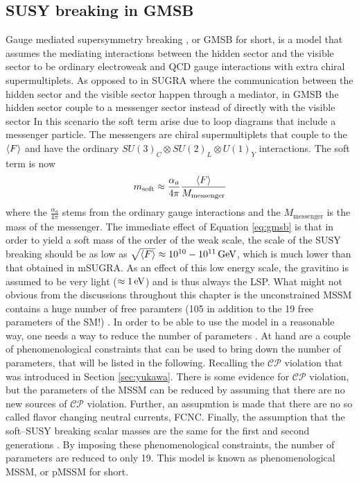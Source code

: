 \subsection*{SUSY breaking in GMSB}
\noindent\justify
Gauge mediated supersymmetry breaking \cite{Dine:1981gu,Nappi:1982hm,Dine:248065}, or GMSB for short, is a model that assumes the mediating interactions between the hidden sector and the visible sector to be ordinary electroweak and QCD gauge interactions with extra chiral supermultiplets. 
As opposed to in SUGRA where the communication between the hidden sector and the visible sector happen through a mediator, in GMSB the hidden sector couple to a messenger sector instead of directly with the visible sector
In this scenario the soft term arise due to loop diagrams that include a messenger particle. 
The messengers are chiral supermultiplets that couple to the $\braket{F}$ and have the ordinary $SU(3)_{C}\otimes SU(2)_{L}\otimes U(1)_{Y}$ interactions. 
The soft term is now
\begin{equation}
m_{\mathrm{soft}}\approx\frac{\alpha_{a}}{4\pi}\frac{\braket{F}}{M_{\mathrm{messenger}}}
\label{eq:gmsb}
\end{equation}
where the $\frac{\alpha_{a}}{4\pi}$ stems from the ordinary gauge interactions and the $M_{\mathrm{messenger}}$ is the mass of the messenger. 
The immediate effect of Equation \ref{eq:gmsb} is that in order to yield a soft mass of the order of the weak scale, the scale of the SUSY breaking should be as low as $\sqrt{\braket{F}}\approx10^{10}-10^{11}\,\text{Ge\hspace{-.08em}V}$, which is much lower than that obtained in mSUGRA.
As an effect of this low energy scale, the gravitino is assumed to be very light ($\approx1\,\text{e\hspace{-.08em}V}$) and is thus always the LSP. 
\newpara
\noindent\justify
What might not obvious from the discussions throughout this chapter is the unconstrained MSSM contains a huge number of free paramters (105 in addition to the 19 free parameters of the SM!) \cite{Dimopoulos:1995ju}.
In order to be able to use the model in a reasonable way, one needs a way to reduce the number of parameters \cite{Djouadi:1998di}. 
At hand are a couple of phenomenological constraints that can be used to bring down the number of parameters, that will be listed in the following. 
Recalling the $\mathcal{CP}$ violation that was introduced in Section \ref{sec:yukawa}. 
There is some evidence for $\mathcal{CP}$ violation, but the parameters of the MSSM can be reduced by assuming that there are no new sources of $\mathcal{CP}$ violation.  
Further, an assupmtion is made that there are no so called flavor changing neutral currents, FCNC. 
Finally, the assumption that the soft–SUSY breaking scalar masses are the same for the first and second generations \cite{Djouadi:1998di}.
By imposing these phenomenological constraints, the number of parameters are reduced to only 19. 
This model is known as phenomenological MSSM, or pMSSM for short.  
